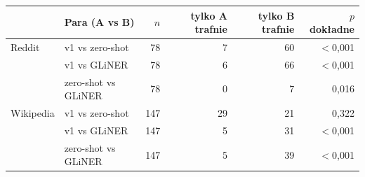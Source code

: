 \begin{tabular}{llrrrr}
\toprule
 & Para (A vs B) & $n$ & tylko A trafnie & tylko B trafnie & $p$ dokładne \\
\midrule
Reddit & v1 vs zero-shot & 78 & 7 & 60 & $<$0{,}001 \\
 & v1 vs GLiNER & 78 & 6 & 66 & $<$0{,}001 \\
 & zero-shot vs GLiNER & 78 & 0 & 7 & 0{,}016 \\
\midrule
Wikipedia & v1 vs zero-shot & 147 & 29 & 21 & 0{,}322 \\
 & v1 vs GLiNER & 147 & 5 & 31 & $<$0{,}001 \\
 & zero-shot vs GLiNER & 147 & 5 & 39 & $<$0{,}001 \\
\bottomrule
\end{tabular}
